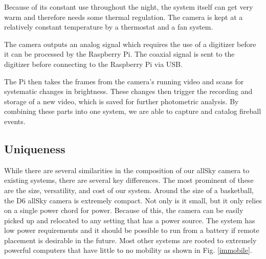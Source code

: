 Because of its constant use throughout the night, the system itself can get very warm and therefore needs some thermal regulation.
The camera is kept at a relatively constant temperature by a thermostat and a fan system. 

The camera outputs an analog signal which requires the use of a digitizer before it can be processed by the Raspberry Pi.
The coaxial signal is sent to the digitizer before connecting to the Raspberry Pi via USB.

The Pi then takes the frames from the camera's running video and scans for systematic changes in brightness.
These changes then trigger the recording and storage of a new video, which is saved for further photometric analysis.
By combining these parts into one system, we are able to capture and catalog fireball events.

\subsection{Uniqueness}

While there are several similarities in the composition of our allSky camera to existing systems, there are several key differences.
The most prominent of these are the size, versatility, and cost of our system.
Around the size of a basketball, the D6 allSky camera is extremely compact.  
Not only is it small, but it only relies on a single power chord for power.  
Because of this, the camera can be easily picked up and relocated to any setting that has a power source.  
The system has low power requirements and it should be possible to run from a battery if remote placement is desirable in the future.
Most other systems are rooted to extremely powerful computers that have little to no mobility as shown in Fig. \ref{immobile}.

